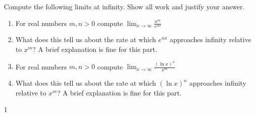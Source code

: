 \documentclass[9pt]{article}
\def\solutions{1}
\begin{document}

\vspace{5mm}

\item Compute the following limits at infinity.  Show all work and justify your answer.

\begin{enumerate}
\item For real numbers $m, n > 0$ compute $ \displaystyle \lim_{x \to \infty} \frac{x^m}{e^{nx}} $
\item What does this tell us about the rate at which $e^{nx}$ approaches infinity relative to $x^m$? A brief explanation is fine for this part.
\item For real numbers $m, n > 0$ compute $ \displaystyle  \lim_{x \to  \infty} \frac{(\ln  x)^n}{x^m} $
\item What does this tell us about the rate at which $(\ln  x)^n$ approaches infinity relative to $x^m$? A brief explanation is fine for this part.
\end{enumerate}
\if\solutions1
\vspace{2mm}
\end{document}
